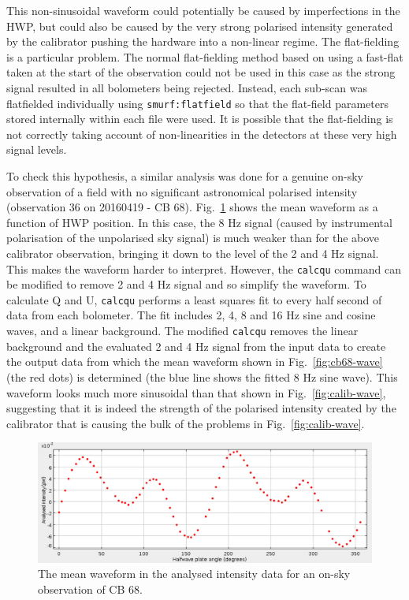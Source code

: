 \documentclass[twoside,11pt]{starlink}
\begin{document}
This non-sinusoidal waveform could potentially be caused by imperfections
in the HWP, but could also be caused by the very strong polarised
intensity generated by the calibrator pushing the hardware into a
non-linear regime. The flat-fielding is a particular problem. The normal
flat-fielding method based on using a fast-flat taken at the start of the
observation could not be used in this case as the strong signal resulted in all
bolometers being rejected. Instead, each sub-scan was flatfielded
individually using \texttt{smurf:flatfield} so that the flat-field
parameters stored internally within each file were used. It is possible
that the flat-fielding is not correctly taking account of non-linearities
in the detectors at these very high signal levels.

To check this hypothesis, a similar analysis was done for a genuine
on-sky observation of a field with no significant astronomical polarised
intensity (observation 36 on 20160419 - CB 68). Fig.~\ref{fig:cb68-wave2}
shows the mean waveform as a function of HWP position. In this case,
the 8 Hz signal (caused by instrumental polarisation of the unpolarised
sky signal) is much weaker than for the above calibrator observation,
bringing it down to the level of the 2 and 4 Hz signal. This makes the
waveform harder to interpret. However, the \texttt{calcqu} command can
be modified to remove 2 and 4 Hz signal and so simplify the waveform.
To calculate Q and U, \texttt{calcqu} performs a least squares fit to
every half second of data from each bolometer. The fit includes 2, 4, 8
and 16 Hz sine and cosine waves, and a linear background. The modified
\texttt{calcqu} removes the linear background and the evaluated 2 and
4 Hz signal from the input data to create the output data from which
the mean waveform shown in Fig.~\ref{fig:cb68-wave} (the red dots)
is determined (the blue line shows the fitted 8 Hz sine wave). This
waveform looks much more sinusoidal than that shown in
Fig.~\ref{fig:calib-wave}, suggesting that it is indeed the strength
of the polarised intensity created by the calibrator that is causing
the bulk of the problems in Fig.~\ref{fig:calib-wave}.

\begin{figure}
\includegraphics[width=\columnwidth]{cb68-wave2}
\caption{The mean waveform in the analysed intensity data for an
on-sky observation of CB 68.}
\label{fig:cb68-wave2}
\end{figure}
\end{document}
